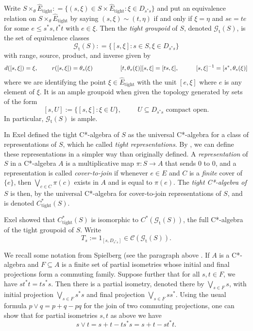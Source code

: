 \documentclass[12pt]{amsart}
\theoremstyle{definition}
\theoremstyle{remark}
\numberwithin{equation}{section}
\newcommand{\Et}{\widehat E_{\text{tight}}}
\newcommand{\Ct}{C^*_{\text{tight}}}
\newcommand{\gt}{\mathcal{G}_{\text{t}}}
\newcommand{\C}{\mathcal{C}}
\begin{document}
	Write $S\times_\theta \Et: = \{(s, \xi)\in S\times \Et: \xi\in D_{s^*s}\}$ and put an equivalence relation on $S\times_\theta \Et$ by saying $(s,\xi)\sim (t, \eta)$ if and only if $\xi = \eta$ and $se = te$ for some $e\leqslant s^*s, t^*t$ with $e\in \xi$. Then the {\em tight groupoid} of $S$, denoted $\gt(S)$, is the set of equivalence classes
	\[
	\gt(S): = \{[s, \xi]: s\in S, \xi\in D_{s^*s}\}
	\]
	with range, source, product, and inverse given by
	\[
	d([s,\xi]) = \xi, \hspace{.8cm}r([s,\xi]) = \theta_s(\xi)\hspace{.8cm}\hspace{.8cm}[t,\theta_s(\xi)][s,\xi] = [ts,\xi], \hspace{1cm}[s,\xi]^{-1} = [s^*, \theta_s(\xi)]
	\]
	where we are identifying the point $\xi\in \Et$ with the unit $[e,\xi]$ where $e$ is any element of $\xi$. 
	It is an ample groupoid when given the topology generated by sets of the form
	\[
	[s,U]:= \{[s,\xi]:\xi\in U\}, \hspace{1cm}U\subseteq D_{s^*s} \text{ compact open}.
	\]
	In particular, $\gt(S)$ is ample. 
	
	In \cite{Ex08} Exel defined the tight C*-algebra of $S$ as the universal C*-algebra for a class of representations of $S$, which he called {\em tight representations}. By \cite[Corollary~2.3]{DM14}, \cite{Ex21} we can define these representations in a simpler way than originally defined. A {\em representation} of $S$ in a C*-algebra $A$ is a multiplicative map $\pi:S\to A$ that sends $0$ to $0$, and a representation is called {\em cover-to-join} if whenever $e\in E$ and $C$ is a {\em finite} cover of $\{e\}$, then $\bigvee_{c\in C} \pi(c)$ exists in $A$ and is equal to $\pi(e)$. The {\em tight C*-algebra of $S$} is then, by \cite[Corollary~2.5]{DM14} the universal C*-algebra for cover-to-join representations of $S$, and is denoted $\Ct(S)$. 
	
	Exel showed that $\Ct(S)$ is isomorphic to $C^*(\gt(S))$, the full C*-algebra of the tight groupoid of $S$.  Write
	\begin{equation}\label{eq:Ts_elt_def}
	T_s:= 1_{[s,D_{s^*s}]} \in \C(\gt(S)).
	\end{equation}
	
	We recall some notation from Spielberg (see the paragraph above \cite[Theorem~6.3]{Sp14}. If $A$ is a C*-algebra and $F\subseteq A$ is a finite set of partial isometries whose initial and final projections form a commuting family. Suppose further that for all $s,t\in F$, we have $st^*t = ts^*s$. Then there is a partial isometry, denoted there by $\bigvee_{s\in F}s$, with initial projection $\bigvee_{s\in F}s^*s$ and final projection $\bigvee_{s\in F}ss^*$. Using the usual formula $p\vee q = p + q - pq$ for the join of two commuting projections, one can show that for partial isometries $s,t$ as above we have
	\begin{equation} \label{eq:operator_s_vee_t}
	s\vee t = s + t - ts^*s = s + t - st^*t.
	\end{equation}
\end{document}

